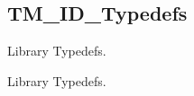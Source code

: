 \hypertarget{group___t_m___i_d___typedefs}{}\subsection{T\+M\+\_\+\+I\+D\+\_\+\+Typedefs}
\label{group___t_m___i_d___typedefs}


Library Typedefs.  


Library Typedefs. 

